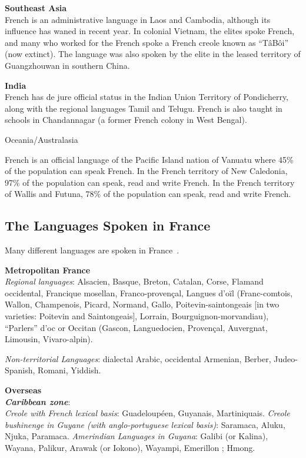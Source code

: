 \begin{multicols}{2}
{\bf Southeast Asia }\\
French is an administrative language in Laos and Cambodia, although
its influence has waned in recent year. In colonial Vietnam, the
elites spoke French, and many who worked for the French spoke a French
creole known as ``TâBôi'' (now extinct). The language was also spoken
by the elite in the leased territory of Guangzhouwan in southern
China.

{\bf India}\\
French has de jure official status in the Indian Union Territory of
Pondicherry, along with the regional languages Tamil and
Telugu. French is also taught in schools in Chandannagar (a former
French colony in West Bengal).

\vspace{0.5cm}
\begin{center}
{\sc Oceania/Australasia}
\end{center}
French is an official language of the Pacific Island nation of Vanuatu
where 45\% of the population can speak French. In the French territory
of New Caledonia, 97\% of the population can speak, read and write
French. In the French territory of Wallis and Futuna, 78\% of the
population can speak, read and write French.

\subsection{The Languages Spoken in France}
\label{languageSpokenInTheFranceEn}
Many different languages are spoken in France~\cite{francais}.

{\bf Metropolitan France}\\
{\em Regional languages}: Alsacien, Basque, Breton, Catalan, Corse, Flamand occidental, Francique mosellan, Franco-provençal, Langues d'oïl (Franc-comtois, Wallon, Champenois, Picard, Normand, Gallo, Poitevin-saintongeais [in two varieties: Poitevin and Saintongeais], Lorrain, Bourguignon-morvandiau), ``Parlers'' d'oc or Occitan (Gascon, Languedocien, Provençal, Auvergnat, Limousin, Vivaro-alpin).

{\em Non-territorial Languages}: dialectal Arabic, occidental Armenian, Berber, Judeo-Spanish, Romani, Yiddish.

{\bf Overseas}\\
\textbf{ \emph{Caribbean zone}}:\\
{\em Creole with French lexical basis}: Guadeloupéen, Guyanais, Martiniquais.
{\em Creole bushinenge in Guyane (with anglo-portuguese lexical basis)}: Saramaca, Aluku, Njuka, Paramaca.
{\em Amerindian Languages in Guyana}: Galibi (or Kalina), Wayana, Palikur, Arawak (or Iokono), Wayampi, Emerillon ; Hmong.


\end{multicols}
